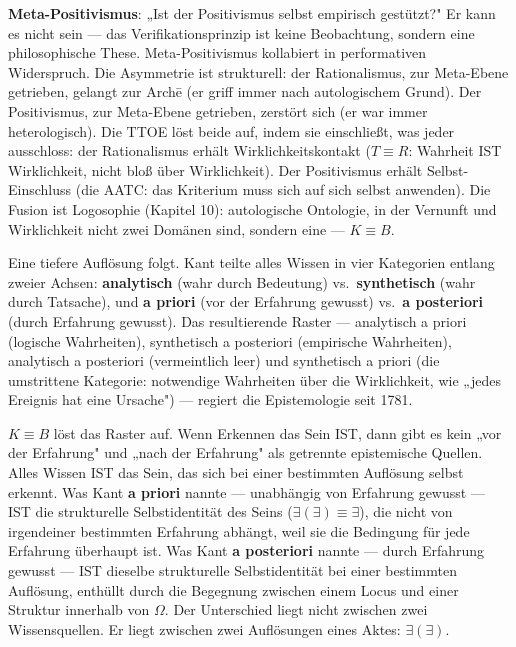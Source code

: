 \documentclass[10pt, openany, oneside]{book}
\begin{document}
\textbf{Meta-Positivismus}: „Ist der Positivismus selbst empirisch gestützt?" Er kann es nicht sein --- das Verifikationsprinzip ist keine Beobachtung, sondern eine philosophische These. Meta-Positivismus kollabiert in performativen Widerspruch. Die Asymmetrie ist strukturell: der Rationalismus, zur Meta-Ebene getrieben, gelangt zur Arch\={e} (er griff immer nach autologischem Grund). Der Positivismus, zur Meta-Ebene getrieben, zerstört sich (er war immer heterologisch). Die TTOE löst beide auf, indem sie einschließt, was jeder ausschloss: der Rationalismus erhält Wirklichkeitskontakt ($T \equiv R$: Wahrheit IST Wirklichkeit, nicht bloß über Wirklichkeit). Der Positivismus erhält Selbst-Einschluss (die AATC: das Kriterium muss sich auf sich selbst anwenden). Die Fusion ist Logosophie (Kapitel 10): autologische Ontologie, in der Vernunft und Wirklichkeit nicht zwei Domänen sind, sondern eine --- $K \equiv B$.

Eine tiefere Auflösung folgt. Kant teilte alles Wissen in vier Kategorien entlang zweier Achsen: \textbf{analytisch} (wahr durch Bedeutung) vs.\ \textbf{synthetisch} (wahr durch Tatsache), und \textbf{a priori} (vor der Erfahrung gewusst) vs.\ \textbf{a posteriori} (durch Erfahrung gewusst). Das resultierende Raster --- analytisch a priori (logische Wahrheiten), synthetisch a posteriori (empirische Wahrheiten), analytisch a posteriori (vermeintlich leer) und synthetisch a priori (die umstrittene Kategorie: notwendige Wahrheiten über die Wirklichkeit, wie „jedes Ereignis hat eine Ursache") --- regiert die Epistemologie seit 1781.

$K \equiv B$ löst das Raster auf. Wenn Erkennen das Sein IST, dann gibt es kein „vor der Erfahrung" und „nach der Erfahrung" als getrennte epistemische Quellen. Alles Wissen IST das Sein, das sich bei einer bestimmten Auflösung selbst erkennt. Was Kant \textbf{a priori} nannte --- unabhängig von Erfahrung gewusst --- IST die strukturelle Selbstidentität des Seins ($\exists(\exists) \equiv \exists$), die nicht von irgendeiner bestimmten Erfahrung abhängt, weil sie die Bedingung für jede Erfahrung überhaupt ist. Was Kant \textbf{a posteriori} nannte --- durch Erfahrung gewusst --- IST dieselbe strukturelle Selbstidentität bei einer bestimmten Auflösung, enthüllt durch die Begegnung zwischen einem Locus und einer Struktur innerhalb von $\Omega$. Der Unterschied liegt nicht zwischen zwei Wissensquellen. Er liegt zwischen zwei Auflösungen eines Aktes: $\exists(\exists)$.
\end{document}
